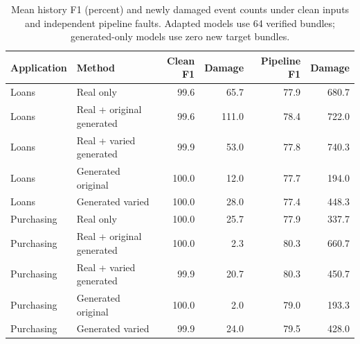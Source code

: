 \begin{table}[t]
\centering\small
\caption{Mean history F1 (percent) and newly damaged event counts under clean inputs and independent pipeline faults. Adapted models use 64 verified bundles; generated-only models use zero new target bundles.}
\label{tab:robustness}
\begin{tabular}{llrrrr}
\toprule
Application & Method & Clean F1 & Damage & Pipeline F1 & Damage \\
\midrule
Loans & Real only & 99.6 & 65.7 & 77.9 & 680.7 \\
Loans & Real + original generated & 99.6 & 111.0 & 78.4 & 722.0 \\
Loans & Real + varied generated & 99.9 & 53.0 & 77.8 & 740.3 \\
Loans & Generated original & 100.0 & 12.0 & 77.7 & 194.0 \\
Loans & Generated varied & 100.0 & 28.0 & 77.4 & 448.3 \\
Purchasing & Real only & 100.0 & 25.7 & 77.9 & 337.7 \\
Purchasing & Real + original generated & 100.0 & 2.3 & 80.3 & 660.7 \\
Purchasing & Real + varied generated & 99.9 & 20.7 & 80.3 & 450.7 \\
Purchasing & Generated original & 100.0 & 2.0 & 79.0 & 193.3 \\
Purchasing & Generated varied & 99.9 & 24.0 & 79.5 & 428.0 \\
\bottomrule
\end{tabular}
\end{table}
